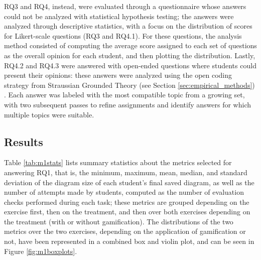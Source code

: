 RQ3 and RQ4, instead, were evaluated through a questionnaire whose answers could not be analyzed with statistical hypothesis testing; the answers were analyzed through descriptive statistics, with a focus on the distribution of scores for Likert-scale questions (RQ3 and RQ4.1). For these questions, the analysis method consisted of computing the average score assigned to each set of questions as the overall opinion for each student, and then plotting the distribution. Lastly, RQ4.2 and RQ4.3 were answered with open-ended questions where students could present their opinions: these answers were analyzed using the open coding strategy from Straussian Grounded Theory (see Section \ref{sec:empirical_methods}) \cite{strauss1998basics}. Each answer was labeled with the most compatible topic from a growing set, with two subsequent passes to refine assignments and identify answers for which multiple topics were suitable.

\subsection{Results}

Table \ref{tab:m1stats} lists summary statistics about the metrics selected for answering RQ1, that is, the minimum, maximum, mean, median, and standard deviation of the diagram size of each student's final saved diagram, as well as the number of attempts made by students, computed as the number of evaluation checks performed during each task; these metrics are grouped depending on the exercise first, then on the treatment, and then over both exercises depending on the treatment (with or without gamification). The distributions of the two metrics over the two exercises, depending on the application of gamification or not, have been represented in a combined box and violin plot, and can be seen in Figure \ref{fig:m1boxplots}.

